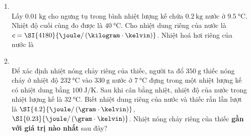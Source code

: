 \begin{enumerate}[label=\bfseries Câu \arabic*:, leftmargin=1.7cm]
\item {}\\
Lấy $\SI{0.01}{\kilogram}$ cho ngưng tụ trong bình nhiệt lượng kế chứa $\SI{0.2}{\kilogram}$ nước ở $\SI{9.5}{\celsius}$. Nhiệt độ cuối cùng đo được là $\SI{40}{\celsius}$. Cho nhiệt dung riêng của nước là $c=\SI{4180}{\joule/\left(\kilogram\cdot\kelvin\right)}$. Nhiệt hoá hơi riêng của nước là
	
	\item {}\\
	Để xác định nhiệt nóng chảy riêng của thiếc, người ta đổ $\SI{350}{\gram}$ thiếc nóng chảy ở nhiệt độ $\SI{232}{\celsius}$ vào $\SI{330}{\gram}$ nước ở $\SI{7}{\celsius}$ đựng trong một nhiệt lượng kế có nhiệt dung bằng $\SI{100}{\joule/\kelvin}$. Sau khi cân bằng nhiệt, nhiệt độ của nước trong nhiệt lượng kế là $\SI{32}{\celsius}$. Biết nhiệt dung riêng của nước và thiếc rắn lần lượt là $\SI{4.2}{\joule/\left(\gram\cdot\kelvin\right)}$, $\SI{0.23}{\joule/\left(\gram\cdot\kelvin\right)}$. Nhiệt nóng chảy riêng của thiếc \textbf{gần với giá trị nào nhất} sau đây?
	\begin{mcq}(4)
		\item $\SI{60}{\joule/\gram}$.
		\item $\SI{73}{\joule/\gram}$.
		\item $\SI{89}{\joule/\gram}$.
		\item $\SI{96}{\joule/\gram}$.
	\end{mcq}
\end{enumerate}
